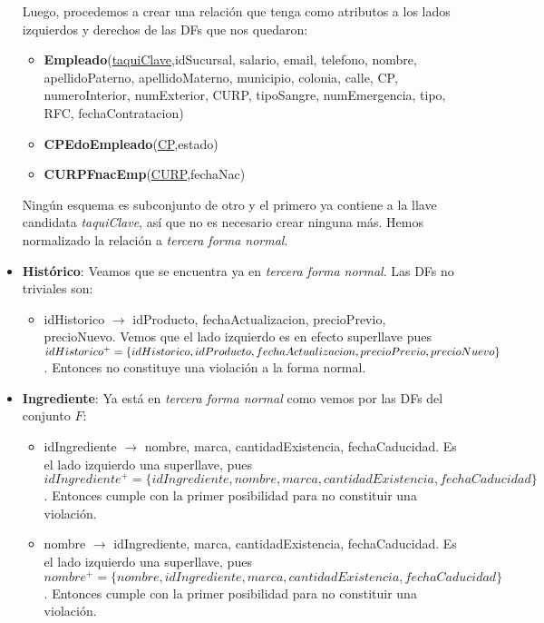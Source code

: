 \documentclass[11pt,letterpaper]{article}
\begin{document}
\begin{itemize}
Luego, procedemos a crear una relación que tenga como atributos a los lados izquierdos y derechos de las DFs que nos quedaron:

\begin{itemize}
\item {\footnotesize \textbf{Empleado}(\underline{taquiClave},idSucursal, salario, email, telefono, nombre, apellidoPaterno, apellidoMaterno,  municipio, colonia, calle, CP, numeroInterior, numExterior, CURP, tipoSangre, numEmergencia, tipo, RFC, fechaContratacion)}
\item {\footnotesize \textbf{CPEdoEmpleado}(\underline{CP},estado)}
\item {\footnotesize \textbf{CURPFnacEmp}(\underline{CURP},fechaNac)}
\end{itemize}

Ningún esquema es subconjunto de otro y el primero ya contiene a la llave candidata \textit{taquiClave}, así que no es necesario crear ninguna más. Hemos normalizado la relación a \textit{tercera forma normal}.

\item \textbf{Histórico}: Veamos que se encuentra ya en \textit{tercera forma normal}. Las DFs no triviales son:

\begin{itemize}
\item idHistorico $\rightarrow$ idProducto, fechaActualizacion, precioPrevio, precioNuevo. Vemos que el lado izquierdo es en efecto superllave pues $idHistorico^+=\{idHistorico,idProducto,\\ fechaActualizacion, precioPrevio, precioNuevo\}$. Entonces no constituye una violación a la forma normal.
\end{itemize}

\item \textbf{Ingrediente}: Ya está en \textit{tercera forma normal} como vemos por las DFs del conjunto $F$:

\begin{itemize}


\item idIngrediente $\rightarrow$ nombre, marca, cantidadExistencia, fechaCaducidad. Es el lado izquierdo una superllave, pues $idIngrediente^+=\{idIngrediente,nombre, marca, cantidadExistencia, fechaCaducidad\}$. Entonces cumple con la primer posibilidad para no constituir una violación.
\item  nombre $\rightarrow$ idIngrediente, marca, cantidadExistencia, fechaCaducidad. Es el lado izquierdo una superllave, pues $nombre^+=\{nombre,idIngrediente, marca, cantidadExistencia, fechaCaducidad\}$. Entonces cumple con la primer posibilidad para no constituir una violación.
\end{itemize}


\end{itemize}
\end{document}
